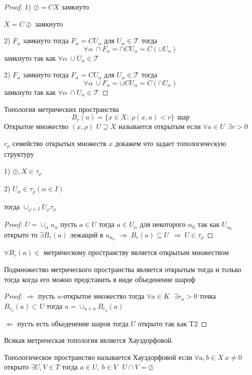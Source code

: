 \begin{proof}
  1) $\oslash = CX$ замкнуто

  $X = C \oslash$ замкнуто

  2) $F_{\alpha}$ замкнуто тогда $F_{\alpha} = CU_{\alpha}$ для
  $U_{\alpha} \in \mathcal{T}$ тогда
  $$
  \forall \alpha ~ \cap F_{\alpha} = \cap CU_{\alpha} = C(\cup U_{\alpha})
  $$
  замкнуто так как $\forall \alpha ~ \cup U_{\alpha} \in \mathcal{T}$

  2) $F_{\alpha}$ замкнуто тогда $F_{\alpha} = CU_{\alpha}$ для
  $U_{\alpha} \in \mathcal{T}$ тогда
  $$
  \forall \alpha ~ \cup F_{\alpha} = \cup CU_{\alpha} = C(\cap U_{\alpha})
  $$
  замкнуто так как $\forall \alpha ~ \cap U_{\alpha} \in \mathcal{T}$
\end{proof}

Топология метрических пространства
$$
B_r(a) = \{x \in X : ~ \rho(x,a) < r\} ~~ \text{шар}
$$
Открытое множество $(x,\rho)$ $U \supseteq X$ называется открытым если
$\forall a \in U ~~ \exists r > 0$

$r_{\rho}$ семейство открытых множеств $x$ докажем что задает топологическую
структуру

1) $\oslash, X \in \tau_{\rho}$

2) $U_{\alpha} \in \tau_{\rho} (\alpha \in I)$

тогда $\cup_{\varphi \in I} U_{\varphi} \tau_{\rho}$

\begin{proof}
  $U = \cup_{\alpha} u_{\alpha}$ пусть $a \in U$ тогда $a \in U_{\alpha}$ для
  некоторого $\alpha_0$ так как $U_{\alpha_0}$ открыто то $\exists B_r(a)$
  лежащий в $u_{\alpha_0} ~~ \Rightarrow ~ B_r (a) \subseteq U ~~ \Rightarrow ~
  U \in \tau_{\rho}$
\end{proof}

\begin{theorem}
  $\forall B_r(a) \in$ метрическому пространству является открытым множеством
\end{theorem}

\begin{theorem}
  Подмножество метрического пространства является открытым тогда и только
  тогда когда его можно представить в виде объеденение шароф
\end{theorem}

\begin{proof}
  $\Rightarrow$ пусть $u$-открытое множество тогда $\forall a \in K ~~~
  \exists r_a > 0$ точка $B_{r_a}(a) \subset U$ тогда $u = \cup_{a \in u}
  B_{r_a}(a)$

  $\Leftarrow$ пусть есть объеденение шаров тогда $U$ открыто так как T2
\end{proof}

\begin{theorem}
  Всякая метрическая топология является Хауздорфовой.

  Топологическое пространство называется Хауздорфовой если $\forall a,b \in X ~
  x \not= 0$ открыто $\exists U, V \in T$ тогда $a \in U, ~ b \in V ~~~
  U \cap V = \oslash$
\end{theorem}
